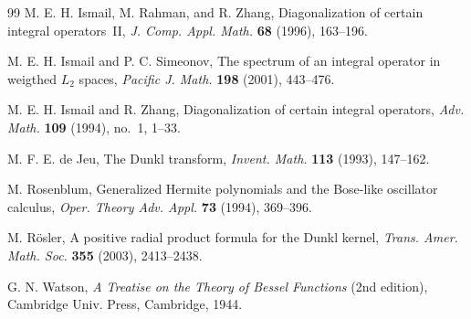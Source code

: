 \documentclass[12pt,a4paper]{amsart}
\theoremstyle{plain}
\theoremstyle{definition}
\begin{document}
\begin{thebibliography}{99}
 M. E. H. Ismail, M. Rahman, and R. Zhang,
{Diagonalization of certain integral operators~II},
\textit{J. Comp. Appl. Math.} \textbf{68} (1996), 163--196.

 M. E. H. Ismail and P. C. Simeonov,
The spectrum of an integral operator in weigthed $L_2$ spaces,
\textit{Pacific J. Math.} \textbf{198} (2001), 443--476.

 M. E. H. Ismail and R. Zhang, {Diagonalization of certain
integral operators}, \textit{Adv. Math.} \textbf{109} (1994), no.~1, 1--33.

 M. F. E. de Jeu, The Dunkl transform, \textit{Invent. Math.}
\textbf{113} (1993), 147--162.

 M. Rosenblum, {Generalized Hermite polynomials and the
Bose-like oscillator calculus,} \textit{Oper. Theory Adv. Appl.} \textbf{73}
(1994), 369--396.

 M. R\"osler, {A positive radial product formula
for the Dunkl kernel,} \textit{Trans. Amer. Math. Soc.} \textbf{355}
(2003), 2413--2438.

 G. N. Watson, \textit{A Treatise on the Theory of
Bessel Functions} (2nd edition), Cambridge Univ. Press,
Cambridge, 1944.

\end{thebibliography}


\end{document}
